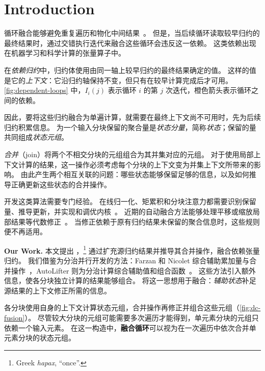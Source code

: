 \section{Introduction}\label{sec:intro}

循环融合能够避免重复遍历和物化中间结果~\citep{halide,tvm}。
但是，当后续循环读取较早归约的最终结果时，通过交错执行迭代来融合这些循环会违反这一依赖。
这类依赖出现在机器学习和科学计算的张量算子中。


在\emph{依赖归约}中，归约体使用由同一轴上较早归约的最终结果确定的值。
这样的值是它的\emph{上下文}：它沿归约轴保持不变，但只有在较早计算完成后才可用。
\cref{fig:dependent-loops} 中，$I_i(j)$ 表示循环 $i$ 的第 $j$ 次迭代，橙色箭头表示循环之间的依赖。

因此，要将这些归约融合为单遍计算，就需要在最终上下文尚不可用时，先为后续归约积累信息。
为一个输入分块保留的聚合量是\emph{状态分量}，简称\emph{状态}；保留的量共同组成\emph{状态元组}。

\emph{合并}（join）将两个不相交分块的元组组合为其并集对应的元组。
对于使用局部上下文计算的结果，这一操作必须考虑每个分块的上下文变为并集上下文所带来的影响。
由此产生两个相互关联的问题：哪些状态能够保留足够的信息，以及如何推导正确更新这些状态的合并操作。

开发这类算法需要专门经验。
在线归一化、矩累积和分块注意力都需要识别保留量、推导更新，并实现和调优内核~\citep{milakov,chan,pebay,flashattention}。
近期的自动融合方法能够处理平移或缩放局部结果等代数修正~\citep{neptune,redfuser}。
当修正依赖于原有归约结果未保留的聚合信息时，这些规则便不再适用。

\textbf{Our Work.}
本文提出 \sys，\footnote{Greek \emph{hapax}, ``once''.} 通过扩充源归约结果并推导其合并操作，融合依赖张量归约。
我们借鉴为分治并行开发的方法：Farzan 和 Nicolet 综合辅助累加量与合并操作~\citep{farzan17,farzan21}，AutoLifter 则为分治计算综合辅助值和组合函数~\citep{autolifter}。
这些方法引入额外信息，使各分块独立计算的结果能够组合。
\sys 将这一思想用于融合：\emph{辅助状态}补足源结果的上下文修正所需的信息。

\par\medskip
\noindent\begin{minipage}{\linewidth}
\begin{minipage}[t]{0.50\linewidth}
\vspace{0pt}
各分块使用自身的上下文计算状态元组，合并操作再修正并组合这些元组（\cref{fig:dc-fusion}）。
尽管较大分块的元组可能需要多次遍历才能得到，单元素分块的元组只依赖一个输入元素。
在这一构造中，{\bfseries 融合循环}可以视为在一次遍历中依次合并单元素分块的状态元组。
\end{minipage}\hfill

\end{minipage}\par\medskip

